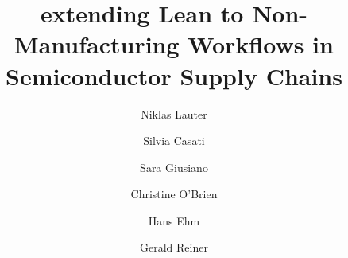 \documentclass[preprint,12pt,authoryear]{elsarticle}
\begin{document}
\begin{frontmatter}

\title{extending Lean to Non-Manufacturing Workflows in Semiconductor Supply Chains}

\author[label1,label2,label3]{Niklas Lauter}
    \address[label1]{Dept.\ of Production Management, University of Economics, 1020 Vienna, Austria\\
    \href{mailto:gerald.reiner@wu.ac.at}{gerald.reiner@wu.ac.at}\\
    }
    
\author[label2]{Silvia Casati}

\author[label2]{Sara Giusiano}

\author[label2]{Christine O'Brien}

\author[label2]{Hans Ehm}
    \address[label2]{Supply Chain Innovation, Infineon Technologies AG, 85579 Neubiberg, Germany\\
    \href{mailto:Niklas.Lauter@infineon.com}{niklas.lauter@infineon.com}\\
    \href{mailto:Silvia.Casati@infineon.com}{silvia.casati@infineon.com}\\
    \href{mailto:Sara.Giusiano@infineon.com}{sara.giusiano@infineon.com}\\
    \href{mailto:Christine.OBrien@infineon.com}{christine.obrien@infineon.com}\\
    \href{mailto:Hans.Ehm@infineon.com}{hans.ehm@infineon.com}\\
    }
\author[label1]{Gerald Reiner}

    \address[label3]{Presenting author}


\end{frontmatter}
\end{document}
